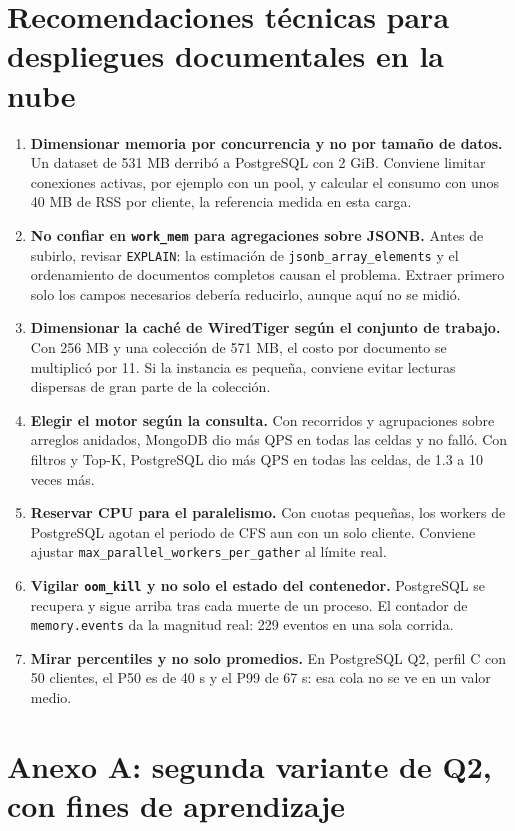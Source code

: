 \documentclass[11pt,letterpaper]{article}
\newcommand{\code}[1]{\texttt{#1}}
\begin{document}
\section{Recomendaciones técnicas para despliegues documentales en la nube}

\begin{enumerate}
\item \textbf{Dimensionar memoria por concurrencia y no por tamaño de datos.} Un dataset de 531 MB derribó a PostgreSQL con 2 GiB. Conviene limitar conexiones activas, por ejemplo con un pool, y calcular el consumo con unos 40 MB de RSS por cliente, la referencia medida en esta carga.
\item \textbf{No confiar en \code{work\_\allowbreak{}mem} para agregaciones sobre JSONB.} Antes de subirlo, revisar \code{EXPLAIN}: la estimación de \code{jsonb\_\allowbreak{}array\_\allowbreak{}elements} y el ordenamiento de documentos completos causan el problema. Extraer primero solo los campos necesarios debería reducirlo, aunque aquí no se midió.
\item \textbf{Dimensionar la caché de WiredTiger según el conjunto de trabajo.} Con 256 MB y una colección de 571 MB, el costo por documento se multiplicó por 11. Si la instancia es pequeña, conviene evitar lecturas dispersas de gran parte de la colección.
\item \textbf{Elegir el motor según la consulta.} Con recorridos y agrupaciones sobre arreglos anidados, MongoDB dio más QPS en todas las celdas y no falló. Con filtros y Top-K, PostgreSQL dio más QPS en todas las celdas, de 1.3 a 10 veces más.
\item \textbf{Reservar CPU para el paralelismo.} Con cuotas pequeñas, los workers de PostgreSQL agotan el periodo de CFS aun con un solo cliente. Conviene ajustar \code{max\_\allowbreak{}parallel\_\allowbreak{}workers\_\allowbreak{}per\_\allowbreak{}gather} al límite real.
\item \textbf{Vigilar \code{oom\_\allowbreak{}kill} y no solo el estado del contenedor.} PostgreSQL se recupera y sigue arriba tras cada muerte de un proceso. El contador de \code{memory.\allowbreak{}events} da la magnitud real: 229 eventos en una sola corrida.
\item \textbf{Mirar percentiles y no solo promedios.} En PostgreSQL Q2, perfil C con 50 clientes, el P50 es de 40 s y el P99 de 67 s: esa cola no se ve en un valor medio.
\end{enumerate}

\section*{Anexo A: segunda variante de Q2, con fines de aprendizaje}
\end{document}
